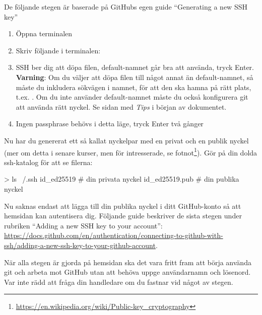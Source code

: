 \begin{Datorarbete}
\vspace*{3mm}

\noindent De följande stegen är baserade på GitHubs egen guide \enquote{Generating a new SSH key}%

\begin{enumerate}
\item Öppna terminalen
\item Skriv följande i terminalen:\\

\item SSH ber dig att döpa filen, default-namnet går bra att använda, tryck Enter.\\
\textbf{Varning}: Om du väljer att döpa filen till något annat än default-namnet, så måste du inkludera sökvägen i namnet, för att den ska hamna på rätt plats, t.ex. 
. 
Om du inte använder default-namnet måste du också konfigurera git att använda rätt nyckel. Se sidan med \emph{Tips} i början av dokumentet.

\item Ingen passphrase behövs i detta läge, tryck Enter två gånger
\end{enumerate}


\noindent Nu har du genererat ett så kallat nyckelpar med en privat och en publik nyckel (mer om detta i senare kurser, men för intresserade, se fotnot\footnote{\url{https://en.wikipedia.org/wiki/Public-key_cryptography}}). Gör  på din dolda ssh-katalog för att se filerna:
\begin{Code}
> ls ~/.ssh
id_ed25519         # din privata nyckel
id_ed25519.pub     # din publika nyckel
\end{Code}

Nu saknas endast att lägga till din publika nyckel i ditt GitHub-konto så att hemsidan kan autentisera dig. Följande guide beskriver de sista stegen under rubriken \enquote{Adding a new SSH key to your account}:\\\href{https://docs.github.com/en/authentication/connecting-to-github-with-ssh/adding-a-new-ssh-key-to-your-github-account#adding-a-new-ssh-key-to-your-account}{https://docs.github.com/en/authentication/connecting-to-github-with-ssh/adding-a-new-ssh-key-to-your-github-account}.

När alla stegen är gjorda på hemsidan ska det vara fritt fram att börja använda git och arbeta mot GitHub utan att behöva uppge användarnamn och lösenord. Var inte rädd att fråga din handledare om du fastnar vid något av stegen.


\end{Datorarbete}
